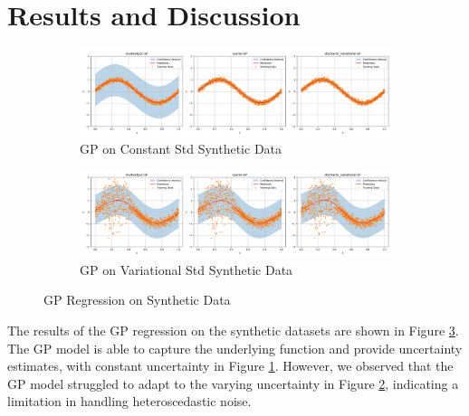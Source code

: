 \documentclass[12pt]{article}
\begin{document}
\section{Results and Discussion}

\begin{figure}[h]
    \centering
    \begin{subfigure}{0.45\textwidth}
        \includegraphics[width=\textwidth]{figs/data_1_fix.png}
        \caption{GP on Constant Std Synthetic Data}
        \label{fig:gp_synthetic_1}
    \end{subfigure}
    \hfill
    \begin{subfigure}{0.45\textwidth}
        \includegraphics[width=\textwidth]{figs/data_1_vari.png}
        \caption{GP on Variational Std Synthetic Data}
        \label{fig:gp_synthetic_2}
    \end{subfigure}
    \caption{GP Regression on Synthetic Data}
    \label{fig:gp_results}
\end{figure}

The results of the GP regression on the synthetic datasets are shown in Figure \ref{fig:gp_results}. The GP model is able to capture the underlying function and provide uncertainty estimates, with constant uncertainty in Figure \ref{fig:gp_synthetic_1}. However, we observed that the GP model struggled to adapt to the varying uncertainty in Figure \ref{fig:gp_synthetic_2}, indicating a limitation in handling heteroscedastic noise.
\end{document}
